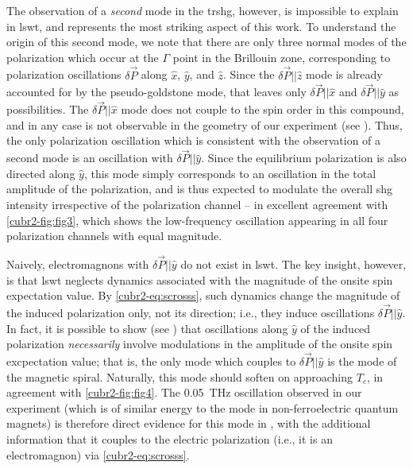 The observation of a \emph{second} mode in the \gls{trshg}, however, is impossible to explain in \gls{lswt}, and represents the most striking aspect of this work.
To understand the origin of this second mode, we note that there are only three normal modes of the polarization which occur at the $\Gamma$ point in the Brillouin zone, corresponding to polarization oscillations $\delta\vec{P}$ along $\hat{x}$, $\hat{y}$, and $\hat{z}$.
Since the $\delta\vec{P} || \hat{z}$ mode is already accounted for by the pseudo-goldstone mode, that leaves only $\delta\vec{P} || \hat{x}$ and $\delta\vec{P} || \hat{y}$ as possibilities.
The $\delta\vec{P} || \hat{x}$ mode does not couple to the spin order in this compound\cite{katsura_dynamical_2007}, and in any case is not observable in the geometry of our experiment (see ).
Thus, the only polarization oscillation which is consistent with the observation of a second mode is an oscillation with $\delta\vec{P} || \hat{y}$.
Since the equilibrium polarization is also directed along $\hat{y}$, this mode simply corresponds to an oscillation in the total amplitude of the polarization, and is thus expected to modulate the overall \gls{shg} intensity irrespective of the polarization channel -- in excellent agreement with \cref{cubr2-fig:fig3}, which shows the low-frequency oscillation appearing in all four polarization channels with equal magnitude.

Naively, electromagnons with $\delta\vec{P} || \hat{y}$ do not exist in \gls{lswt}.
The key insight, however, is that \gls{lswt} neglects dynamics associated with the magnitude of the onsite spin expectation value.
By \cref{cubr2-eq:scrosss}, such dynamics change the magnitude of the induced polarization only, not its direction; i.e., they induce oscillations $\delta\vec{P} || \hat{y}$.
In fact, it is possible to show (see ) that oscillations along $\hat{y}$ of the induced polarization \emph{necessarily} involve modulations in the amplitude of the onsite spin excpectation value; that is, the only mode which couples to $\delta\vec{P} || \hat{y}$ is the \higgs mode of the magnetic spiral.
Naturally, this mode should soften on approaching $T_c$, in agreement with \cref{cubr2-fig:fig4}.
The \qty{0.05}{THz} oscillation observed in our experiment (which is of similar energy to the \higgs mode in non-ferroelectric quantum magnets\citet{hong_higgs_2017}) is therefore direct evidence for this mode in , with the additional information that it couples to the electric polarization (i.e., it is an electromagnon) via \cref{cubr2-eq:scrosss}.

